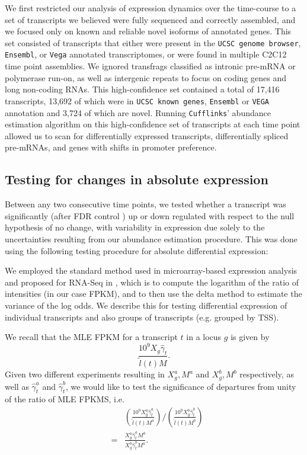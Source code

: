\documentclass[12pt]{amsart}
\theoremstyle{definition}
\begin{document}
We first restricted our analysis of expression dynamics over the time-course
to a set of transcripts we believed were fully sequenced and correctly
assembled, and we focused only on known and reliable novel isoforms of
annotated genes. This set consisted of transcripts that either were present in
the {\tt UCSC genome browser}, {\tt Ensembl}, or {\tt Vega} annotated
transcriptomes, or were found in multiple C2C12 time point assemblies. We
ignored transfrags classified as intronic pre-mRNA or polymerase run-on, as
well as intergenic repeats to focus on coding genes and long non-coding RNAs.
This high-confidence set contained a total of 17,416 transcripts, 13,692 of
which were in {\tt UCSC known genes}, {\tt Ensembl} or {\tt VEGA} annotation
and 3,724 of which are novel. Running {\tt Cufflinks}' abundance estimation
algorithm on this high-confidence set of transcripts at each time point
allowed us to scan for differentially expressed transcripts, differentially
spliced pre-mRNAs, and genes with shifts in promoter preference.

\subsection{Testing for changes in absolute expression} 

Between any two consecutive time points, we tested whether a transcript was
significantly (after FDR control \cite{Benjamini1995}) up or down regulated with respect to the
null hypothesis of no change, with variability in expression due solely to the
uncertainties resulting from our abundance estimation procedure. This was done
using the following testing procedure for absolute differential expression:

We employed the standard method used in microarray-based expression analysis
and proposed for RNA-Seq in \cite{Bullard2010}, which is to compute the
logarithm of the ratio of intensities (in our case FPKM), and to then use the
delta method to estimate the variance of the log odds. We describe this for
testing differential expression of individual transcripts and also groups of
transcripts (e.g. grouped by TSS).

We recall that the MLE FPKM for a transcript $t$ in a locus $g$ is given by 
\begin{equation}
\frac{10^9X_g\hat{\gamma}_t}{\tilde{l}(t)M}.
\end{equation}
Given two different experiments resulting in $X^a_g,M^a$ and $X^b_g,M^b$ respectively, as well as $\hat{\gamma}^a_t$ and $\hat{\gamma}^b_t$, we would like to test the significance of departures from unity of the ratio of MLE FPKMS, i.e. 
\begin{eqnarray}
& & \left(\frac{10^9X^a_g\hat{\gamma}^a_t}{\tilde{l}(t)M^a}\right) / \left(\frac{10^9X^b_g\hat{\gamma}^b_t}{\tilde{l}(t)M^b}\right)\\
& = & \frac{X_g^a\hat{\gamma}^a_tM^b}{X_g^b \hat{\gamma}^b_tM^a}.
\end{eqnarray}
\end{document}
